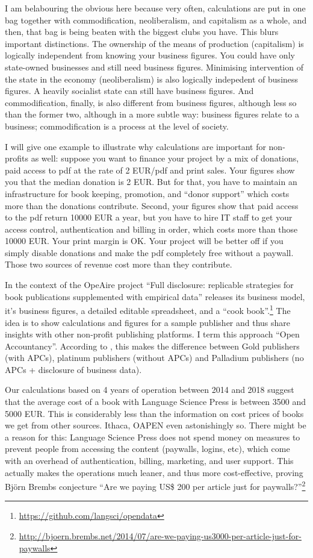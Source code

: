 \documentclass[12pt]{article}
\begin{document}
I am belabouring the obvious here because very often, calculations are put in one bag together with commodification, neoliberalism, and capitalism as a whole, and then, that bag is being beaten with the biggest clubs you have. This blurs important distinctions. The ownership of the means of production (capitalism) is logically independent from knowing your business figures. You could have only state-owned businesses and still need business figures. Minimising intervention of the state in the economy (neoliberalism) is also logically indepedent of business figures. A heavily socialist state can still have business figures. And commodification, finally, is also different from business figures, although less so than the former two, although in a more subtle way: business figures relate to a business; commodification is a process at the level of society.

I will give one example to illustrate why calculations are important for non-profits as well: suppose you want to finance your project by a mix of donations, paid access to pdf at the rate of 2 EUR/pdf and print sales. Your figures show you that the median donation is 2 EUR. But for that, you have to maintain an infrastructure for book keeping, promotion, and ``donor support'' which costs more than the donations contribute. Second, your figures show that paid access to the pdf return 10000 EUR a year, but you have to hire IT staff to get your access control, authentication and billing in order, which costs more than those 10000 EUR. Your print margin is OK. Your project will be better off if you simply disable donations and make the pdf completely free without a paywall. Those two sources of revenue cost more than they contribute. 

In the context of the OpeAire project ``Full disclosure: replicable strategies for book publications supplemented with empirical data'' releases its business model, it's business figures, a detailed editable spreadsheet, and a ``cook book''.\footnote{\url{https://github.com/langsci/opendata}} The idea is to show calculations and figures for a sample publisher and thus share insights with other non-profit publishing platforms. I term this approach ``Open Accountancy''. According to \citet{Caux2017}, this makes the difference between Gold publishers (with APCs), platinum publishers (without APCs) and Palladium publishers (no APCs + disclosure of business data). 

Our calculations based on 4 years of operation between 2014 and 2018 suggest that the average cost of a book with Language Science Press is between 3500 and 5000 EUR. This is considerably less than the information on cost prices of books we get from other sources. Ithaca, OAPEN %
even astonishingly so. There might be a reason for this: Language Science Press does not spend money on measures to prevent people from accessing the content (paywalls, logins, etc), which come with an overhead of authentication, billing, marketing, and user support. This actually makes the operations much leaner, and thus more cost-effective, proving Björn Brembs conjecture ``Are we paying US\$ 200 per article just for paywalls?''\footnote{\url{http://bjoern.brembs.net/2014/07/are-we-paying-us3000-per-article-just-for-paywalls}}
\end{document}
